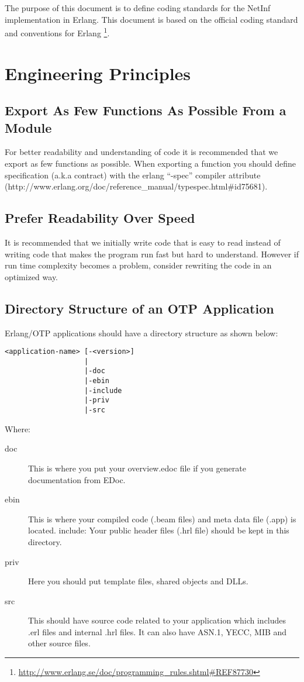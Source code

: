 The purpose of this document is to define coding standards for the NetInf implementation in Erlang. This document is based on the official coding standard and conventions for Erlang \footnote{\url{http://www.erlang.se/doc/programming\_rules.shtml\#REF87730}}. 

\section{Engineering Principles}
\subsection{Export As Few Functions As Possible From a Module}
For better readability and understanding of code it is recommended that we export as few functions as possible. When exporting a function you should define specification (a.k.a contract) with the erlang “-spec” compiler attribute (http://www.erlang.org/doc/reference\_manual/typespec.html\#id75681). 

\subsection{Prefer Readability Over Speed}
It is recommended that we initially write code that is easy to read instead of writing code that makes the program run fast but hard to understand. However if run time complexity becomes a problem, consider rewriting the code in an optimized way. 

\subsection{Directory Structure of an OTP Application}
Erlang/OTP applications should have a directory structure as shown below:
\begin{lstlisting}	
<application-name> [-<version>]
                   |
                   |-doc
                   |-ebin
                   |-include
                   |-priv
                   |-src
\end{lstlisting}
Where: 
\begin{description}
\item[doc] This is where you put your overview.edoc file if you generate documentation from EDoc. 
\item[ebin] This is where your compiled code (.beam files) and meta data file (.app) is located. 
include: Your public header files (.hrl file) should be kept in this directory.  
\item[priv] Here you should put template files, shared objects and DLLs. 
\item[src] This should have source code related to your application which includes .erl files and internal .hrl files. It can also have ASN.1, YECC, MIB and other source files.
\end{description}

